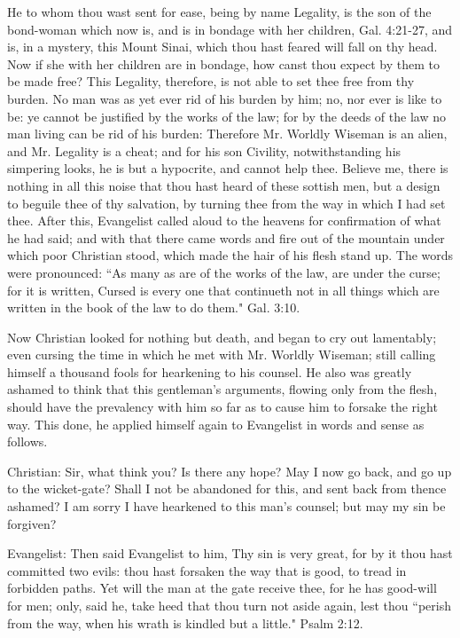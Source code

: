 He to whom thou wast sent for ease, being by name Legality, is the son of the bond-woman which now is, and is in bondage with her children, Gal. 4:21-27, and is, in a mystery, this Mount Sinai, which thou hast feared will fall on thy head. Now if she with her children are in bondage, how canst thou expect by them to be made free? This Legality, therefore, is not able to set thee free from thy burden. No man was as yet ever rid of his burden by him; no, nor ever is like to be: ye cannot be justified by the works of the law; for by the deeds of the law no man living can be rid of his burden: Therefore Mr. Worldly Wiseman is an alien, and Mr. Legality is a cheat; and for his son Civility, notwithstanding his simpering looks, he is but a hypocrite, and cannot help thee. Believe me, there is nothing in all this noise that thou hast heard of these sottish men, but a design to beguile thee of thy salvation, by turning thee from the way in which I had set thee. After this, Evangelist called aloud to the heavens for confirmation of what he had said; and with that there came words and fire out of the mountain under which poor Christian stood, which made the hair of his flesh stand up. The words were pronounced: ``As many as are of the works of the law, are under the curse; for it is written, Cursed is every one that continueth not in all things which are written in the book of the law to do them." Gal. 3:10. 

Now Christian looked for nothing but death, and began to cry out lamentably; even cursing the time in which he met with Mr. Worldly Wiseman; still calling himself a thousand fools for hearkening to his counsel. He also was greatly ashamed to think that this gentleman's arguments, flowing only from the flesh, should have the prevalency with him so far as to cause him to forsake the right way. This done, he applied himself again to Evangelist in words and sense as follows. 

Christian: Sir, what think you? Is there any hope? May I now go back, and go up to the wicket-gate? Shall I not be abandoned for this, and sent back from thence ashamed? I am sorry I have hearkened to this man's counsel; but may my sin be forgiven? 

Evangelist: Then said Evangelist to him, Thy sin is very great, for by it thou hast committed two evils: thou hast forsaken the way that is good, to tread in forbidden paths. Yet will the man at the gate receive thee, for he has good-will for men; only, said he, take heed that thou turn not aside again, lest thou ``perish from the way, when his wrath is kindled but a little." Psalm 2:12.